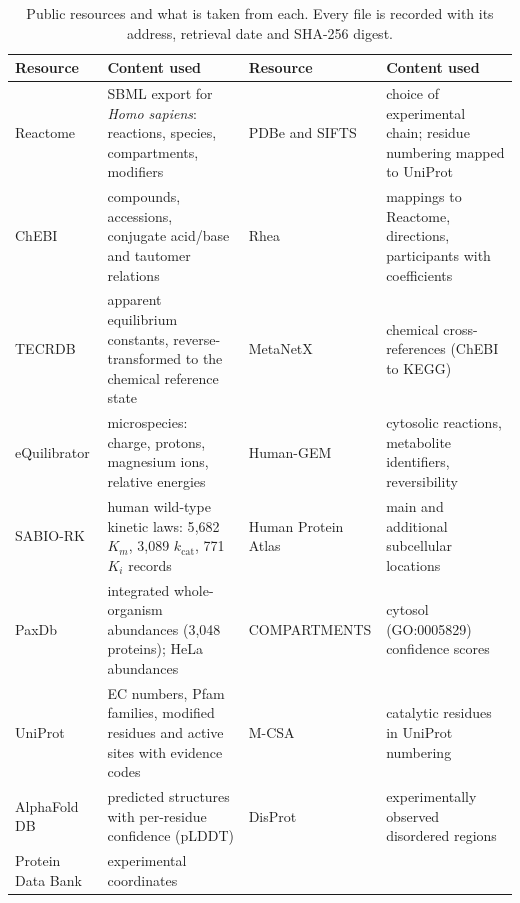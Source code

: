 \begin{table}[t]
\centering
\caption{Public resources and what is taken from each. Every file is recorded with its address, retrieval date and SHA-256 digest.}
\label{tab:sources}
\footnotesize
\begin{tabularx}{\textwidth}{@{}l>{\raggedright\arraybackslash}X l>{\raggedright\arraybackslash}X@{}}
\toprule
Resource & Content used & Resource & Content used \\
\midrule
Reactome \citep{gillespie2022reactome} & SBML export for \textit{Homo sapiens}: reactions, species, compartments, modifiers &
PDBe and SIFTS \citep{velankar2013sifts} & choice of experimental chain; residue numbering mapped to UniProt \\
ChEBI \citep{hastings2016chebi} & compounds, accessions, conjugate acid/base and tautomer relations &
Rhea \citep{bansal2022rhea} & mappings to Reactome, directions, participants with coefficients \\
TECRDB \citep{goldberg2004tecrdb} & apparent equilibrium constants, reverse-transformed to the chemical reference state &
MetaNetX \citep{moretti2021metanetx} & chemical cross-references (ChEBI to KEGG) \\
eQuilibrator \citep{beber2022equilibrator} & microspecies: charge, protons, magnesium ions, relative energies &
Human-GEM \citep{robinson2020humangem} & cytosolic reactions, metabolite identifiers, reversibility \\
SABIO-RK \citep{wittig2012sabio} & human wild-type kinetic laws: 5{,}682 $K_m$, 3{,}089 $k_{\mathrm{cat}}$, 771 $K_i$ records &
Human Protein Atlas \citep{thul2017hpa} & main and additional subcellular locations \\
PaxDb \citep{wang2015paxdb,nagaraj2011hela} & integrated whole-organism abundances (3{,}048 proteins); HeLa abundances &
COMPARTMENTS \citep{binder2014compartments} & cytosol (GO:0005829) confidence scores \\
UniProt \citep{uniprot2023} & EC numbers, Pfam families, modified residues and active sites with evidence codes &
M-CSA \citep{ribeiro2018mcsa} & catalytic residues in UniProt numbering \\
AlphaFold DB \citep{varadi2022afdb} & predicted structures with per-residue confidence (pLDDT) &
DisProt \citep{quaglia2022disprot} & experimentally observed disordered regions \\
Protein Data Bank \citep{berman2000pdb} & experimental coordinates & & \\
\bottomrule
\end{tabularx}
\end{table}
